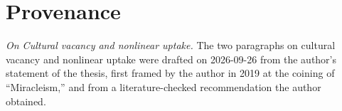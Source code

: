 \section*{Provenance}

\noindent\textit{On Cultural vacancy and nonlinear uptake.} The two paragraphs on cultural vacancy and nonlinear uptake were drafted on 2026-09-26 from the author's statement of the thesis, first framed by the author in 2019 at the coining of ``Miracleism,'' and from a literature-checked recommendation the author obtained.

\printbibliography

